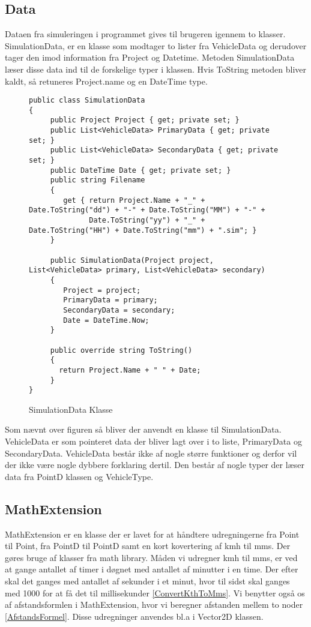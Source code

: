 \subsection{Data}
Dataen fra simuleringen i programmet gives til brugeren igennem to klasser. SimulationData, er en klasse som modtager to lister fra VehicleData og derudover tager den imod information fra Project og Datetime. Metoden SimulationData læser disse data ind til de forskelige typer i klassen. Hvis ToString metoden bliver kaldt, så retuneres Project.name og en DateTime type.

\begin{figure}[H]
\begin{lstlisting}
public class SimulationData
{
     public Project Project { get; private set; }
     public List<VehicleData> PrimaryData { get; private set; }
     public List<VehicleData> SecondaryData { get; private set; }
     public DateTime Date { get; private set; }
     public string Filename
     {
        get { return Project.Name + "_" + Date.ToString("dd") + "-" + Date.ToString("MM") + "-" + 
              Date.ToString("yy") + "_" + Date.ToString("HH") + Date.ToString("mm") + ".sim"; }
     }
        
     public SimulationData(Project project, List<VehicleData> primary, List<VehicleData> secondary)
     {
        Project = project;
        PrimaryData = primary;
        SecondaryData = secondary;
        Date = DateTime.Now;
     }

     public override string ToString()
     {
       return Project.Name + " " + Date;
     }
}
\end{lstlisting}
\caption{SimulationData Klasse} \label{SimulatonDataClass}
\end{figure}

Som nævnt over figuren så bliver der anvendt en klasse til SimulationData. VehicleData er som pointeret data der bliver lagt over i to liste, PrimaryData og SecondaryData. VehicleData består ikke af nogle større funktioner og derfor vil der ikke være nogle dybbere forklaring dertil. Den består af nogle typer der læser data fra PointD klassen og VehicleType.

\subsection{MathExtension}
MathExtension er en klasse der er lavet for at håndtere udregningerne fra Point til Point, fra PointD til PointD samt en kort kovertering af kmh til mms. Der gøres bruge af klasser fra math library. Måden vi udregner kmh til mms, er ved at gange antallet af timer i døgnet med antallet af minutter i en time. Der efter skal det ganges med antallet af sekunder i et minut, hvor til sidst skal ganges med 1000 for at få det til millisekunder \ref{ConvertKthToMms}. Vi benytter også os af afstandsformlen i MathExtension, hvor vi beregner afstanden mellem to noder \ref{AfstandsFormel}. Disse udregninger anvendes bl.a i Vector2D klassen.

